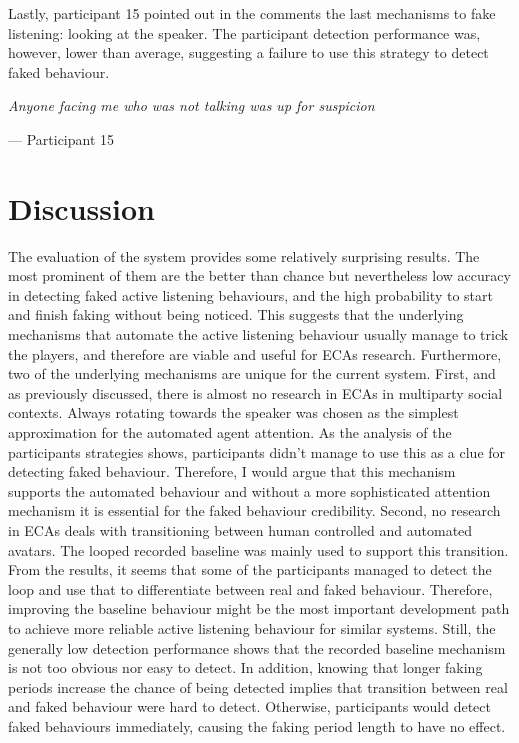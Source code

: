 \documentclass[]{simple-thesis}
\begin{document}
Lastly, participant 15 pointed out in the comments the last mechanisms to fake listening: looking at the speaker.
The participant detection performance was, however, lower than average, suggesting a failure to use this strategy to detect faked behaviour.

\begin{displayquote}
  \textit{Anyone facing me who was not talking was up for suspicion}

  \hfill
  --- Participant 15
\end{displayquote}

\section{Discussion}

The evaluation of the system provides some relatively surprising results.
The most prominent of them are the better than chance but nevertheless low accuracy in detecting faked active listening behaviours, and the high probability to start and finish faking without being noticed.
This suggests that the underlying mechanisms that automate the active listening behaviour usually manage to trick the players, and therefore are viable and useful for ECAs research.
Furthermore, two of the underlying mechanisms are unique for the current system.
First, and as previously discussed, there is almost no research in ECAs in multiparty social contexts.
Always rotating towards the speaker was chosen as the simplest approximation for the automated agent attention.
As the analysis of the participants strategies shows, participants didn't manage to use this as a clue for detecting faked behaviour.
Therefore, I would argue that this mechanism supports the automated behaviour and without a more sophisticated attention mechanism it is essential for the faked behaviour credibility.
Second, no research in ECAs deals with transitioning between human controlled and automated avatars.
The looped recorded baseline was mainly used to support this transition.
From the results, it seems that some of the participants managed to detect the loop and use that to differentiate between real and faked behaviour.
Therefore, improving the baseline behaviour might be the most important development path to achieve more reliable active listening behaviour for similar systems.
Still, the generally low detection performance shows that the recorded baseline mechanism is not too obvious nor easy to detect.
In addition, knowing that longer faking periods increase the chance of being detected implies that transition between real and faked behaviour were hard to detect.
Otherwise, participants would detect faked behaviours immediately, causing the faking period length to have no effect.
\end{document}
